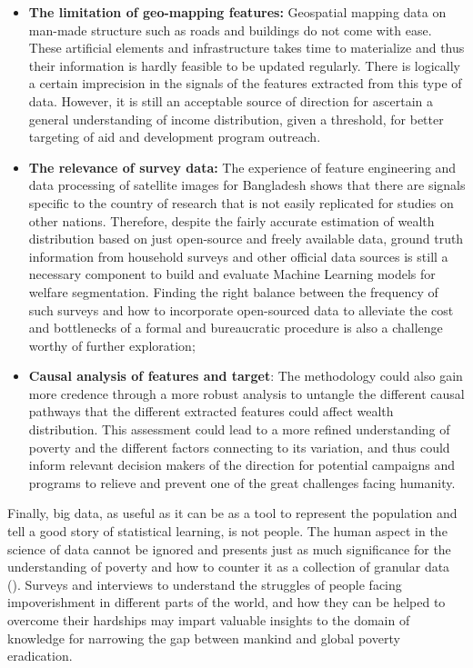 \documentclass[solid,math,chem,code,plot,gloss]{bmc}
\begin{document}
\begin{itemize}
    \item \textbf{The limitation of geo-mapping features:} Geospatial mapping data on man-made structure such as roads and buildings do not come with ease. These artificial elements and infrastructure takes time to materialize and thus their information is hardly feasible to be updated regularly. There is logically a certain imprecision in the signals of the features extracted from this type of data. However, it is still an acceptable source of direction for ascertain a general understanding of income distribution, given a threshold, for better targeting of aid and development program outreach. 
    
    \item \textbf{The relevance of survey data:} The experience of feature engineering and data processing of satellite images for Bangladesh shows that there are signals specific to the country of research that is not easily replicated for studies on other nations. Therefore, despite the fairly accurate estimation of wealth distribution based on just open-source and freely available data, ground truth information from household surveys and other official data sources is still a necessary component to build and evaluate Machine Learning models for welfare segmentation. Finding the right balance between the frequency of such surveys and how to incorporate open-sourced data to alleviate the cost and bottlenecks of a formal and bureaucratic procedure is also a challenge worthy of further exploration;
    
    \item \textbf{Causal analysis of features and target}: The methodology could also gain more credence through a more robust analysis to untangle the different causal pathways that the different extracted features could affect wealth distribution. This assessment could lead to a more refined understanding of poverty and the different factors connecting to its variation, and thus could inform relevant decision makers of the direction for potential campaigns and programs to relieve and prevent one of the great challenges facing humanity.

\end{itemize}

Finally, big data, as useful as it can be as a tool to represent the population and tell a good story of statistical learning, is not people. The human aspect in the science of data cannot be ignored and presents just as much significance for the understanding of poverty and how to counter it as a collection of granular data (\cite{Blumenstock_2018}). Surveys and interviews to understand the struggles of people facing impoverishment in different parts of the world, and how they can be helped to overcome their hardships may impart valuable insights to the domain of knowledge for narrowing the gap between mankind and global poverty eradication. 
\end{document}
